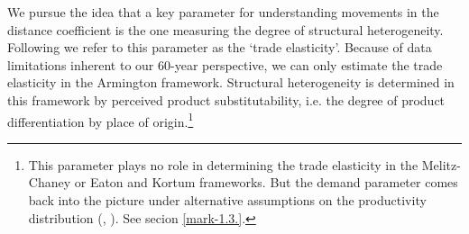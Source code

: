 \documentclass[12pt,twoside,a4paper,notitlepage]{article}
\begin{document}
We pursue the idea that a key parameter for understanding movements in the distance coefficient is the one measuring the degree of structural heterogeneity.
Following \cite{Arkolakis2012} we refer to this parameter as the `trade elasticity'.
Because of data limitations inherent to our 60-year perspective, we can only estimate the trade elasticity in the Armington framework.
Structural heterogeneity is determined in this framework by perceived product substitutability, i.e.
the degree of product differentiation by place of origin.\footnote{This parameter plays no role in determining the trade elasticity in the Melitz-Chaney or Eaton and Kortum frameworks. But the demand parameter comes back into the picture under alternative assumptions on the productivity distribution  (\cite{Bas2017}, \cite{Feenstra2018a}). See secion \ref{mark-1.3.}.}
\end{document}
